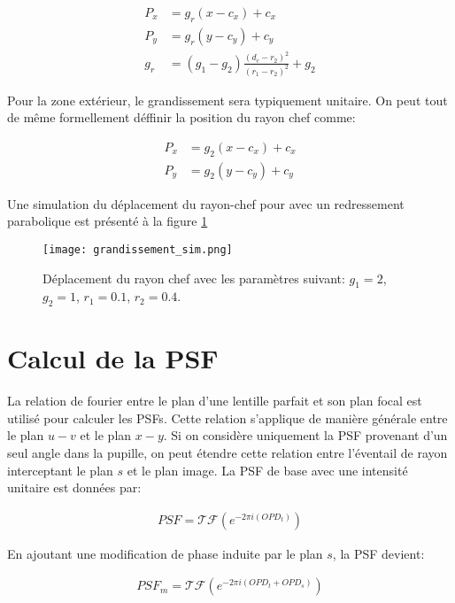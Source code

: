 \documentclass[a4paper,10pt]{article}
\numberwithin{equation}{section}
\numberwithin{figure}{section}
\numberwithin{table}{section}
\begin{document}
\begin{align}
	P_x &= g_r(x-c_x) + c_x \\
	P_y &= g_r(y-c_y) + c_y \\
	g_r &= (g_1 - g_2)\frac{(d_c-r_2)^2}{(r_1-r_2)^2} + g_2
\end{align}

Pour la zone extérieur, le grandissement sera typiquement unitaire. On peut tout de même formellement déffinir la position du rayon chef comme: 

\begin{align}
	P_x &= g_2(x-c_x) + c_x \\
	P_y &= g_2(y-c_y) + c_y
\end{align}

Une simulation du déplacement du rayon-chef pour avec un redressement parabolique est présenté à la figure \ref{fig:grandissement_sim}

\begin{figure}[ht]
	\centering
	\texttt{[image: grandissement\_sim.png]}
	\caption{Déplacement du rayon chef avec les paramètres suivant: $g_1 = 2$, $g_2 = 1$, $r_1 = 0.1$, $r_2 = 0.4$.}
	\label{fig:grandissement_sim}
\end{figure}

\FloatBarrier

\section{Calcul de la PSF}

La relation de fourier entre le plan d'une lentille parfait et son plan focal est utilisé pour calculer les PSFs. Cette relation s'applique de manière générale entre le plan $u-v$ et le plan $x-y$. Si on considère uniquement la PSF provenant d'un seul angle dans la pupille, on peut étendre cette relation entre l'éventail de rayon interceptant le plan $s$ et le plan image. La PSF de base avec une intensité unitaire est données par:

\begin{align}
	PSF = \mathcal{TF}\left(e^{-2\pi i (OPD_{t})}\right)
\end{align}

En ajoutant une modification de phase induite par le plan $s$, la PSF devient:

\begin{align}
	PSF_m = \mathcal{TF}\left(e^{-2\pi i (OPD_t+OPD_s)}\right)
\end{align}
\end{document}
